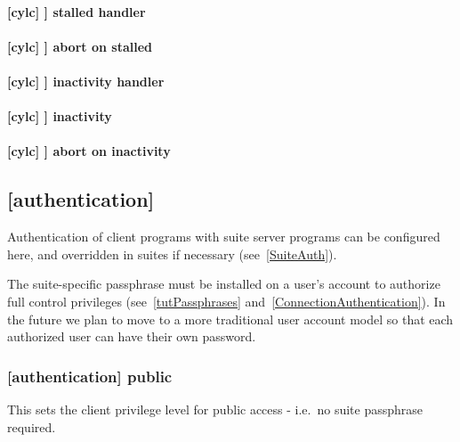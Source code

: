 \paragraph[stalled handler]{[cylc] \textrightarrow [[events]] \textrightarrow stalled handler}

\paragraph[abort on stalled]{[cylc] \textrightarrow [[events]] \textrightarrow abort on stalled}

\paragraph[inactivity handler]{[cylc] \textrightarrow [[events]] \textrightarrow inactivity handler}

\paragraph[inactivity]{[cylc] \textrightarrow [[events]] \textrightarrow inactivity}

\paragraph[abort on inactivity]{[cylc] \textrightarrow [[events]] \textrightarrow abort on inactivity}

\subsection{[authentication]}
\label{GlobalAuth}

Authentication of client programs with suite server programs can be configured
here, and overridden in suites if necessary (see~\ref{SuiteAuth}).

The suite-specific passphrase must be installed on a user's account to
authorize full control privileges (see~\ref{tutPassphrases}
and~\ref{ConnectionAuthentication}). In the future we plan to move to a more
traditional user account model so that each authorized user can have their own
password.

\subsubsection[public]{[authentication] \textrightarrow public}

This sets the client privilege level for public access - i.e.\ no suite passphrase
required.

